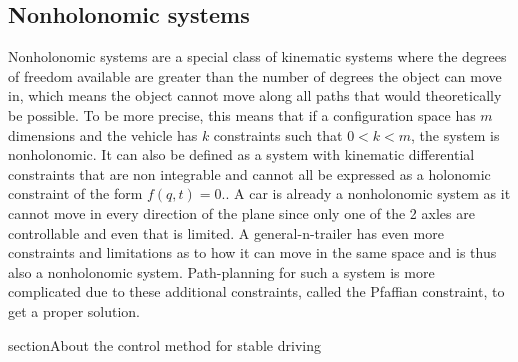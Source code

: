 
\subsection{Nonholonomic systems}
\label{sec:nonholonomic_systems}

Nonholonomic systems are a special class of kinematic systems where the degrees of freedom available are greater than the number of degrees the object can move in, which means the object cannot move along all paths that would theoretically be possible. To be more precise, this means that if a configuration space has $m$ dimensions and the vehicle has $k$ constraints such that $0<k<m$, the system is nonholonomic. It can also be defined as a system with kinematic differential constraints that are non integrable and cannot all be expressed as a holonomic constraint of the form $f(q,t)=0$.\cite{29,30}. A car is already a nonholonomic system as it cannot move in every direction of the plane since only one of the 2 axles are controllable and even that is limited. A general-n-trailer has even more constraints and limitations as to how it can move in the same space and is thus also a nonholonomic system. Path-planning for such a system is more complicated due to these additional constraints, called the Pfaffian constraint, to get a proper solution. 

section{About the control method for stable driving}
\label{sec:about_control_method}

